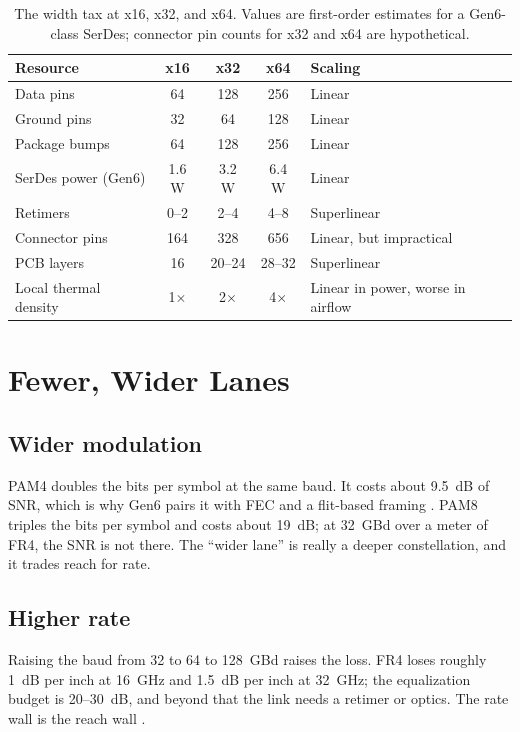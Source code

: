 \documentclass[10pt,letterpaper]{article}
\begin{document}
\begin{table}[t]
\centering
\caption{The width tax at x16, x32, and x64. Values are first-order estimates for a Gen6-class SerDes; connector pin counts for x32 and x64 are hypothetical.}
\label{tab:width}
\small
\begin{tabularx}{\linewidth}{@{}lcccX@{}}
\toprule
Resource & x16 & x32 & x64 & Scaling \\
\midrule
Data pins & 64 & 128 & 256 & Linear \\
Ground pins & 32 & 64 & 128 & Linear \\
Package bumps & 64 & 128 & 256 & Linear \\
SerDes power (Gen6) & 1.6 W & 3.2 W & 6.4 W & Linear \\
Retimers & 0--2 & 2--4 & 4--8 & Superlinear \\
Connector pins & 164 & 328 & 656 & Linear, but impractical \\
PCB layers & 16 & 20--24 & 28--32 & Superlinear \\
Local thermal density & 1$\times$ & 2$\times$ & 4$\times$ & Linear in power, worse in airflow \\
\bottomrule
\end{tabularx}
\end{table}

\section{Fewer, Wider Lanes}
\label{sec:fewer}

\subsection{Wider modulation}

PAM4 doubles the bits per symbol at the same baud. It costs about 9.5~dB of SNR, which is why Gen6 pairs it with FEC and a flit-based framing \cite{pcie6}. PAM8 triples the bits per symbol and costs about 19~dB; at 32~GBd over a meter of FR4, the SNR is not there. The ``wider lane'' is really a deeper constellation, and it trades reach for rate.

\subsection{Higher rate}

Raising the baud from 32 to 64 to 128~GBd raises the loss. FR4 loses roughly 1~dB per inch at 16~GHz and 1.5~dB per inch at 32~GHz; the equalization budget is 20--30~dB, and beyond that the link needs a retimer or optics. The rate wall is the reach wall \cite{oif}.
\end{document}
